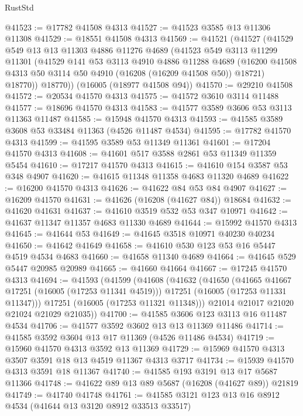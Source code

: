 \begin{lexlean}{RustStd}
\begin{coremodule}
@41523 := @17782 @41508 @4313
@41527 := @41523 @3585 @13 @11306 @11308
@41529 := @18551 @41508 @4313
@41569 := @41521
    (@41527
      (@41529
        @549
        @13
        @13
        @11303
        @4886
        @11276
        @4689
        (@41523
          @549
          @3113
          @11299
          @11301
          (@41529
            @141
            @53
            @3113
            @4910
            @4886
            @11288
            @4689
            (@16200 @41508 @4313 @50 @3114 @50 @4910 (@16208 (@16209 @41508 @50)) @18721)
            @18770))
        @18770))
    (@16005 (@18977 @41508 @94))
@41570 := @29210 @41508
@41572 := @20534 @41570 @4313
@41575 := @41572 @3610 @3114 @11488
@41577 := @18696 @41570 @4313
@41583 := @41577 @3589 @3606 @53 @3113 @11363 @11487
@41585 := @15948 @41570 @4313
@41593 := @41585 @3589 @3608 @53 @33484 @11363 (@4526 @11487 @4534)
@41595 := @17782 @41570 @4313
@41599 := @41595 @3589 @53 @11349 @11361
@41601 := @17204 @41570 @4313
@41608 := @41601 @517 @3588 @2861 @53 @11349 @11359 @5454
@41610 := @17217 @41570 @4313
@41615 := @41610 @154 @3587 @53 @348 @4907
@41620 := @41615 @11348 @11358 @4683 @11320 @4689
@41622 := @16200 @41570 @4313
@41626 := @41622 @84 @53 @84 @4907
@41627 := @16209 @41570
@41631 := @41626 (@16208 (@41627 @84)) @18684
@41632 := @41620 @41631
@41637 := @41610 @3519 @532 @53 @347 @10971
@41642 := @41637 @11347 @11357 @4683 @11330 @4689
@41644 := @15992 @41570 @4313
@41645 := @41644 @53
@41649 := @41645 @3518 @10971 @40230 @40234
@41650 := @41642 @41649
@41658 := @41610 @530 @123 @53 @16 @5447 @4519 @4534 @4683
@41660 := @41658 @11340 @4689
@41664 := @41645 @529 @5447 @20985 @20989
@41665 := @41660 @41664
@41667 := @17245 @41570 @4313
@41694 := @41593
    (@41599
      (@41608
        (@41632
          (@41650
            (@41665 @41667 @17251 (@16005 (@17253 @11341 @4519)))
            @17251
            (@16005 (@17253 @11331 @11347)))
          @17251
          (@16005 (@17253 @11321 @11348)))
        @21014
        @21017
        @21020
        @21024
        @21029
        @21035))
@41700 := @41585 @3606 @123 @3113 @16 @11487 @4534
@41706 := @41577 @3592 @3602 @13 @13 @11369 @11486
@41714 := @41585 @3592 @3604 @13 @17 @11369 (@4526 @11486 @4534)
@41719 := @15960 @41570 @4313 @3592 @13 @11369
@41729 := @15969 @41570 @4313 @3507 @3591 @18 @13 @4519 @11367 @4313 @3717
@41734 := @15939 @41570 @4313 @3591 @18 @11367
@41740 := @41585 @193 @3191 @13 @17 @5687 @11366
@41748 := @41622 @89 @13 @89 @5687 (@16208 (@41627 @89)) @21819
@41749 := @41740 @41748
@41761 := @41585 @3121 @123 @13 @16 @8912 @4534 (@41644 @13 @3120 @8912 @33513 @33517)

\end{coremodule}
\end{lexlean}

